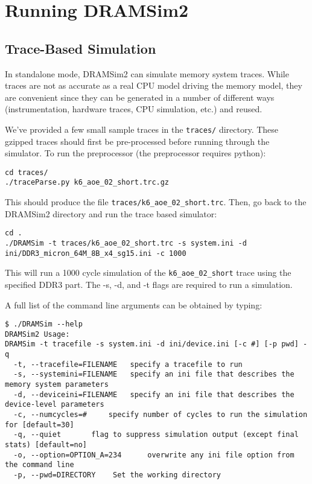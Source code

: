 \documentclass[11pt]{article}
\begin{document}
\section{Running DRAMSim2}
\begin{minipage}{\textwidth}
\subsection{Trace-Based Simulation}

In standalone mode, DRAMSim2 can simulate memory system traces. While traces are not as accurate
as a real CPU model driving the memory model, they are convenient since they can be generated in a number of different
ways (instrumentation, hardware traces, CPU simulation, etc.) and reused. 

We've provided a few small sample traces in the \texttt{traces/} directory. These gzipped
traces should first be pre-processed before running through the simulator. 
To run the preprocessor (the preprocessor requires python): 
\begin{lstlisting}
cd traces/
./traceParse.py k6_aoe_02_short.trc.gz
\end{lstlisting}
  This should produce the file \texttt{traces/k6\_aoe\_02\_short.trc}. Then, go back to the DRAMSim2 directory and run the trace based simulator:

\begin{lstlisting}
cd .
./DRAMSim -t traces/k6_aoe_02_short.trc -s system.ini -d ini/DDR3_micron_64M_8B_x4_sg15.ini -c 1000
\end{lstlisting}
  This will run a 1000 cycle simulation of the \texttt{k6\_aoe\_02\_short} trace using 
  the specified DDR3 part. The -s, -d, and -t flags are required to run a simulation.

  A full list of the command line arguments can be obtained by typing:
\begin{lstlisting}
$ ./DRAMSim --help
DRAMSim2 Usage: 
DRAMSim -t tracefile -s system.ini -d ini/device.ini [-c #] [-p pwd] -q
  -t, --tracefile=FILENAME   specify a tracefile to run  
  -s, --systemini=FILENAME   specify an ini file that describes the memory system parameters  
  -d, --deviceini=FILENAME   specify an ini file that describes the device-level parameters
  -c, --numcycles=#     specify number of cycles to run the simulation for [default=30] 
  -q, --quiet       flag to suppress simulation output (except final stats) [default=no]
  -o, --option=OPTION_A=234      overwrite any ini file option from the command line
  -p, --pwd=DIRECTORY    Set the working directory


\end{lstlisting}
\end{minipage}
\end{document}
